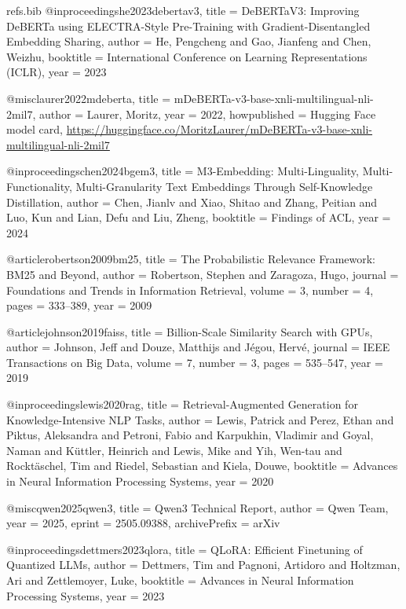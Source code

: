 \begin{filecontents*}[overwrite]{refs.bib}
@inproceedings{he2023debertav3,
  title     = {{DeBERTaV3}: Improving {DeBERTa} using {ELECTRA}-Style Pre-Training with Gradient-Disentangled Embedding Sharing},
  author    = {He, Pengcheng and Gao, Jianfeng and Chen, Weizhu},
  booktitle = {International Conference on Learning Representations (ICLR)},
  year      = {2023}
}

@misc{laurer2022mdeberta,
  title        = {{mDeBERTa-v3-base-xnli-multilingual-nli-2mil7}},
  author       = {Laurer, Moritz},
  year         = {2022},
  howpublished = {Hugging Face model card, \url{https://huggingface.co/MoritzLaurer/mDeBERTa-v3-base-xnli-multilingual-nli-2mil7}}
}

@inproceedings{chen2024bgem3,
  title     = {{M3-Embedding}: Multi-Linguality, Multi-Functionality, Multi-Granularity Text Embeddings Through Self-Knowledge Distillation},
  author    = {Chen, Jianlv and Xiao, Shitao and Zhang, Peitian and Luo, Kun and Lian, Defu and Liu, Zheng},
  booktitle = {Findings of ACL},
  year      = {2024}
}

@article{robertson2009bm25,
  title   = {The Probabilistic Relevance Framework: {BM25} and Beyond},
  author  = {Robertson, Stephen and Zaragoza, Hugo},
  journal = {Foundations and Trends in Information Retrieval},
  volume  = {3},
  number  = {4},
  pages   = {333--389},
  year    = {2009}
}

@article{johnson2019faiss,
  title   = {Billion-Scale Similarity Search with {GPUs}},
  author  = {Johnson, Jeff and Douze, Matthijs and J{\'e}gou, Herv{\'e}},
  journal = {IEEE Transactions on Big Data},
  volume  = {7},
  number  = {3},
  pages   = {535--547},
  year    = {2019}
}

@inproceedings{lewis2020rag,
  title     = {Retrieval-Augmented Generation for Knowledge-Intensive {NLP} Tasks},
  author    = {Lewis, Patrick and Perez, Ethan and Piktus, Aleksandra and Petroni, Fabio and Karpukhin, Vladimir and Goyal, Naman and K{\"u}ttler, Heinrich and Lewis, Mike and Yih, Wen-tau and Rockt{\"a}schel, Tim and Riedel, Sebastian and Kiela, Douwe},
  booktitle = {Advances in Neural Information Processing Systems},
  year      = {2020}
}

@misc{qwen2025qwen3,
  title         = {Qwen3 Technical Report},
  author        = {{Qwen Team}},
  year          = {2025},
  eprint        = {2505.09388},
  archivePrefix = {arXiv}
}

@inproceedings{dettmers2023qlora,
  title     = {{QLoRA}: Efficient Finetuning of Quantized {LLMs}},
  author    = {Dettmers, Tim and Pagnoni, Artidoro and Holtzman, Ari and Zettlemoyer, Luke},
  booktitle = {Advances in Neural Information Processing Systems},
  year      = {2023}
}


\end{filecontents*}
